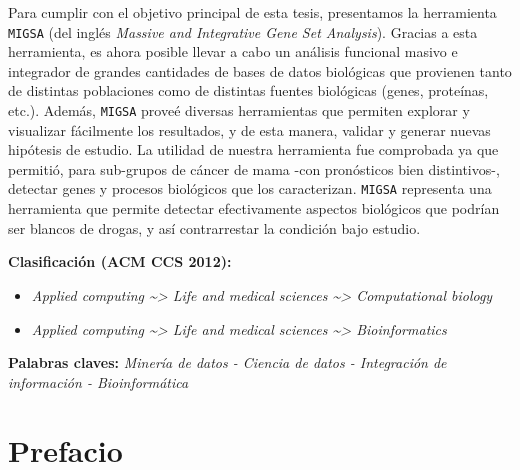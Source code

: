 \documentclass[12pt,twoside]{reedthesis}
\providecommand{\tightlist}{%
  \setlength{\itemsep}{0pt}\setlength{\parskip}{0pt}}
\begin{document}
\begin{resumen}
    Para cumplir con el objetivo principal de esta tesis, presentamos la herramienta \texttt{MIGSA} (del inglés \emph{Massive and Integrative Gene Set Analysis}). Gracias a esta herramienta, es ahora posible llevar a cabo un análisis funcional masivo e integrador de grandes cantidades de bases de datos biológicas que provienen tanto de distintas poblaciones como de distintas fuentes biológicas (genes, proteínas, etc.). Además, \texttt{MIGSA} proveé diversas herramientas que permiten explorar y visualizar fácilmente los resultados, y de esta manera, validar y generar nuevas hipótesis de estudio. La utilidad de nuestra herramienta fue comprobada ya que permitió, para sub-grupos de cáncer de mama -con pronósticos bien distintivos-, detectar genes y procesos biológicos que los caracterizan. \texttt{MIGSA} representa una herramienta que permite detectar efectivamente aspectos biológicos que podrían ser blancos de drogas, y así contrarrestar la condición bajo estudio.
    
    \textbf{Clasificación (ACM CCS 2012):}
    \begin{itemize}
    \tightlist
    \item
      \emph{Applied computing \textasciitilde{}\textgreater{} Life and medical sciences \textasciitilde{}\textgreater{} Computational biology}
    \item
      \emph{Applied computing \textasciitilde{}\textgreater{} Life and medical sciences \textasciitilde{}\textgreater{} Bioinformatics}
    \end{itemize}
    \textbf{Palabras claves:} \emph{Minería de datos - Ciencia de datos - Integración de información - Bioinformática}
  \end{resumen}


  \hypersetup{linkcolor=black}
  \setcounter{tocdepth}{2}
  \tableofcontents



\mainmatter %
\pagestyle{fancyplain} %

\hypertarget{prefacio}{%
\chapter*{Prefacio}\label{prefacio}}

\par
\end{document}
